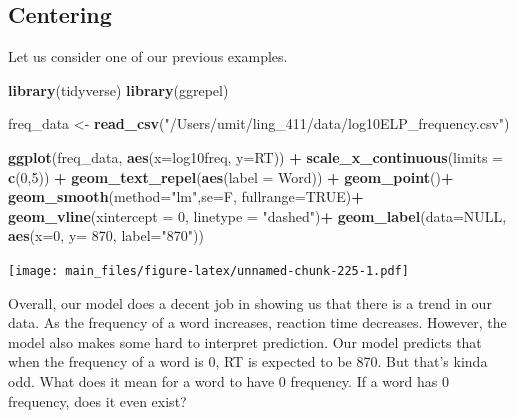 \documentclass[
]{book}
\newenvironment{Shaded}{\begin{snugshade}}{\end{snugshade}}
\newcommand{\AttributeTok}[1]{\textcolor[rgb]{0.13,0.29,0.53}{#1}}
\newcommand{\ConstantTok}[1]{\textcolor[rgb]{0.56,0.35,0.01}{#1}}
\newcommand{\DecValTok}[1]{\textcolor[rgb]{0.00,0.00,0.81}{#1}}
\newcommand{\FunctionTok}[1]{\textcolor[rgb]{0.13,0.29,0.53}{\textbf{#1}}}
\newcommand{\NormalTok}[1]{#1}
\newcommand{\OtherTok}[1]{\textcolor[rgb]{0.56,0.35,0.01}{#1}}
\newcommand{\SpecialCharTok}[1]{\textcolor[rgb]{0.81,0.36,0.00}{\textbf{#1}}}
\newcommand{\StringTok}[1]{\textcolor[rgb]{0.31,0.60,0.02}{#1}}
\begin{document}
\subsection{Centering}\label{centering}

Let us consider one of our previous examples.

\begin{Shaded}
\begin{Highlighting}[]
\FunctionTok{library}\NormalTok{(tidyverse)}
\FunctionTok{library}\NormalTok{(ggrepel)}
\end{Highlighting}
\end{Shaded}

\begin{Shaded}
\begin{Highlighting}[]
\NormalTok{freq\_data }\OtherTok{\textless{}{-}} \FunctionTok{read\_csv}\NormalTok{(}\StringTok{"/Users/umit/ling\_411/data/log10ELP\_frequency.csv"}\NormalTok{)}

\FunctionTok{ggplot}\NormalTok{(freq\_data, }\FunctionTok{aes}\NormalTok{(}\AttributeTok{x=}\NormalTok{log10freq, }\AttributeTok{y=}\NormalTok{RT)) }\SpecialCharTok{+}
  \FunctionTok{scale\_x\_continuous}\NormalTok{(}\AttributeTok{limits =} \FunctionTok{c}\NormalTok{(}\DecValTok{0}\NormalTok{,}\DecValTok{5}\NormalTok{)) }\SpecialCharTok{+}
  \FunctionTok{geom\_text\_repel}\NormalTok{(}\FunctionTok{aes}\NormalTok{(}\AttributeTok{label =}\NormalTok{ Word)) }\SpecialCharTok{+}
  \FunctionTok{geom\_point}\NormalTok{()}\SpecialCharTok{+}
  \FunctionTok{geom\_smooth}\NormalTok{(}\AttributeTok{method=}\StringTok{"lm"}\NormalTok{,}\AttributeTok{se=}\NormalTok{F, }\AttributeTok{fullrange=}\ConstantTok{TRUE}\NormalTok{)}\SpecialCharTok{+}
  \FunctionTok{geom\_vline}\NormalTok{(}\AttributeTok{xintercept =} \DecValTok{0}\NormalTok{, }\AttributeTok{linetype =} \StringTok{"dashed"}\NormalTok{)}\SpecialCharTok{+}
  \FunctionTok{geom\_label}\NormalTok{(}\AttributeTok{data=}\ConstantTok{NULL}\NormalTok{, }\FunctionTok{aes}\NormalTok{(}\AttributeTok{x=}\DecValTok{0}\NormalTok{, }\AttributeTok{y=} \DecValTok{870}\NormalTok{, }\AttributeTok{label=}\StringTok{"870"}\NormalTok{))}
\end{Highlighting}
\end{Shaded}

\texttt{[image: main\_files/figure-latex/unnamed-chunk-225-1.pdf]}

Overall, our model does a decent job in showing us that there is a trend in our data. As the frequency of a word increases, reaction time decreases. However, the model also makes some hard to interpret prediction. Our model predicts that when the frequency of a word is 0, RT is expected to be 870. But that's kinda odd. What does it mean for a word to have 0 frequency. If a word has 0 frequency, does it even exist?
\end{document}
